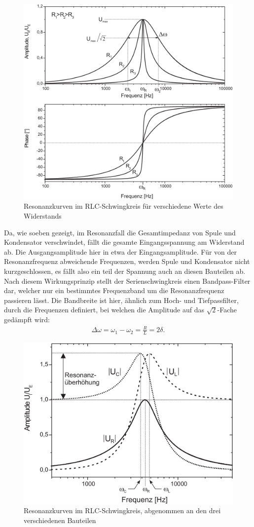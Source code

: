 \begin{figure}[H]
  \centering
  \includegraphics[width=.70\textwidth]{files/script/resonanzkurve_widerstaende.png}
  \caption{Resonanzkurven im RLC-Schwingkreis für verschiedene Werte des Widerstands}
  \label{fig:resonanzkurve_widerstaende}
\end{figure}

Da, wie soeben gezeigt, im Resonanzfall die Gesamtimpedanz von Spule und Kondensator verschwindet, fällt die gesamte Eingangsspannung am Widerstand ab. Die Ausgangsamplitude hier in etwa der Eingangsamplitude. Für von der Resonanzfrequenz abweichende Frequenzen, werden Spule und Kondensator nicht kurzgeschlossen, es fällt also ein teil der Spannung auch an diesen Bauteilen ab. Nach diesem Wirkungsprinzip stellt der Serienschwingkreis einen Bandpass-Filter dar, welcher nur ein bestimmtes Frequenzband um die Resonanzfrequenz passieren lässt. Die Bandbreite ist hier, ähnlich zum Hoch- und Tiefpassfilter, durch die Frequenzen definiert, bei welchen die Amplitude auf das $\sqrt{2}$-Fache gedämpft wird:
\begin{align}
  \Delta \omega = \omega_1 - \omega_2 = \frac{R}{L} = 2\delta.\label{eq:rlc_bandbreite}
\end{align}

\begin{figure}[H]
  \centering
  \includegraphics[width=.70\textwidth]{files/script/resonanzkurve_rlc.png}
  \caption{Resonanzkurven im RLC-Schwingkreis, abgenommen an den drei verschiedenen Bauteilen}
  \label{fig:resonanzkurve_rlc}
\end{figure}

